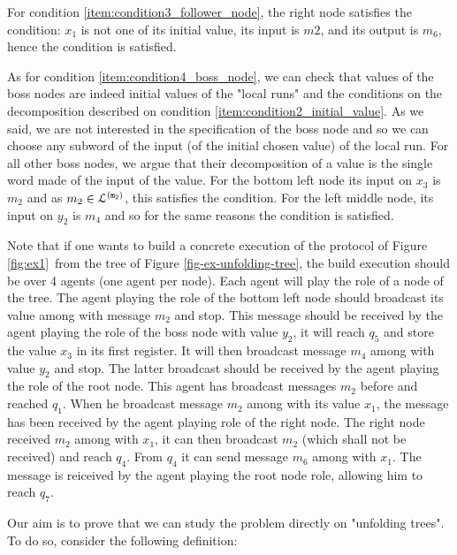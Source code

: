 \begin{example}
	For condition \ref{item:condition3_follower_node}, the right node satisfies the condition: $x_1$ is not one of its initial value, its input is $m2$, and its output is $m_6$, hence the condition is satisfied.
	
	As for condition \ref{item:condition4_boss_node}, we can check that values of the boss nodes are indeed initial values of the "local runs" and the conditions on the decomposition described on condition \ref{item:condition2_initial_value}. As we said, we are not interested in the specification of the boss node and so we can choose any subword of the input (of the initial chosen value) of the local run. For all other boss nodes, we argue that their decomposition of a value is the single word made of the input of the value. For the bottom left node its input on $x_3$ is $m_2$ and as $m_2 \in \mathcal{L}^{\mathtt{(m_2)}}$, this satisfies the condition. For the left middle node, its input on $y_2$ is $m_4$ and so for the same reasons the condition is satisfied.
	
	
	
	
	Note that if one wants to build a concrete execution of the protocol of Figure \ref{fig:ex1}~from the tree of Figure \ref{fig-ex-unfolding-tree}, the build execution should be over 4 agents (one agent per node). Each agent will play the role of a node of the tree. The agent playing the role of the bottom left node should broadcast its value among with message $m_2$ and stop. This message should be received by the agent playing the role of the boss node with value $y_2$, it will reach $q_5$ and store the value $x_3$ in its first register. It will then broadcast message $m_4$ among with value $y_2$ and stop. The latter broadcast should be received by the agent playing the role of the root node. This agent has broadcast messages $m_2$ before and reached $q_1$. When he broadcast message $m_2$ among with its value $x_1$, the message has been received by the agent playing role of the right node.
	The right node received $m_2$ among with $x_1$, it can then broadcast $m_2$ (which shall not be received) and reach $q_4$. From $q_4$ it can send message $m_6$ among with $x_1$. The message is reiceived by the agent playing the root node role, allowing him to reach $q_7$.
	
	
	

\end{example}


Our aim is to prove that we can study the \COVER problem directly on "unfolding trees". To do so, consider the following definition: 

